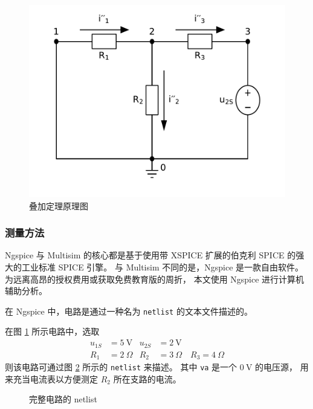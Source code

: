 \documentclass[UTF8,linespread=1.236]{ctexart}
\newcommand\unitV{\:\mathrm{V}}
\newcommand\unitOhm{\:\Omega}
\begin{document}
\begin{figure}[htbp]
{\begin{minipage}{0.29\textwidth}
    \includegraphics[width=\textwidth]{vs2.pdf}
\end{minipage}}
\caption{叠加定理原理图}\label{circuits}
\end{figure}

\subsubsection{测量方法}

Ngspice 与 Multisim 的核心都是基于使用带 XSPICE 扩展的伯克利 SPICE 的强大的工业标准 SPICE 引擎。
与 Multisim 不同的是，Ngspice 是一款自由软件。
为远离高昂的授权费用或获取免费教育版的周折，
本文使用 Ngspice 进行计算机辅助分析。

在 Ngspice 中，电路是通过一种名为 \verb|netlist| 的文本文件描述的。

在图 \ref{circuits} 所示电路中，选取
\[
\begin{aligned}
u_{1S} &= 5 \unitV & u_{2S} &= 2 \unitV \\
R_1 &= 2 \unitOhm & R_2 &= 3 \unitOhm \quad R_3 = 4 \unitOhm
\end{aligned}
\]
则该电路可通过图 \ref{netlistfile} 所示的 \verb|netlist| 来描述。
其中 \verb|va| 是一个 $0\unitV$ 的电压源，
用来充当电流表以方便测定 $R_2$ 所在支路的电流。

\begin{figure}[!htbp]
\centering
{}
\caption{完整电路的 netlist}\label{netlistfile}
\end{figure}
\end{document}
